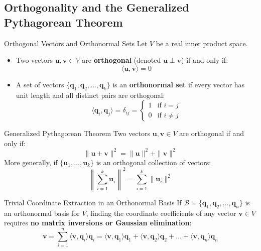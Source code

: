 \subsection{Orthogonality and the Generalized Pythagorean Theorem}

\begin{definitionbox}{Orthogonal Vectors and Orthonormal Sets}
 
Let $V$ be a real inner product space.
\begin{itemize}
    \item Two vectors $\mathbf{u}, \mathbf{v} \in V$ are \textbf{orthogonal} (denoted $\mathbf{u} \perp \mathbf{v}$) if and only if:
    \begin{equation}
    \langle \mathbf{u}, \mathbf{v} \rangle = 0
    \end{equation}
    \item A set of vectors $\{\mathbf{q}_1, \mathbf{q}_2, \dots, \mathbf{q}_k\}$ is an \textbf{orthonormal set} if every vector has unit length and all distinct pairs are orthogonal:
    \begin{equation}
    \langle \mathbf{q}_i, \mathbf{q}_j \rangle = \delta_{ij} = \begin{cases} 1 & \text{if } i = j \\ 0 & \text{if } i \neq j \end{cases}
    \end{equation}
\end{itemize}
\end{definitionbox}

\begin{theorembox}{Generalized Pythagorean Theorem}
Two vectors $\mathbf{u}, \mathbf{v} \in V$ are orthogonal if and only if:
\begin{equation}
\|\mathbf{u} + \mathbf{v}\|^2 = \|\mathbf{u}\|^2 + \|\mathbf{v}\|^2
\end{equation}
More generally, if $\{\mathbf{u}_1, \dots, \mathbf{u}_k\}$ is an orthogonal collection of vectors:
\begin{equation}
\left\| \sum_{i=1}^k \mathbf{u}_i \right\|^2 = \sum_{i=1}^k \|\mathbf{u}_i\|^2
\end{equation}
\end{theorembox}

\begin{theorembox}{Trivial Coordinate Extraction in an Orthonormal Basis}
If $\mathcal{B} = \{\mathbf{q}_1, \mathbf{q}_2, \dots, \mathbf{q}_n\}$ is an orthonormal basis for $V$, finding the coordinate coefficients of any vector $\mathbf{v} \in V$ requires \textbf{no matrix inversions or Gaussian elimination}:
\begin{equation}
\mathbf{v} = \sum_{i=1}^n \langle \mathbf{v}, \mathbf{q}_i \rangle \mathbf{q}_i = \langle \mathbf{v}, \mathbf{q}_1 \rangle \mathbf{q}_1 + \langle \mathbf{v}, \mathbf{q}_2 \rangle \mathbf{q}_2 + \dots + \langle \mathbf{v}, \mathbf{q}_n \rangle \mathbf{q}_n
\end{equation}
\end{theorembox}

